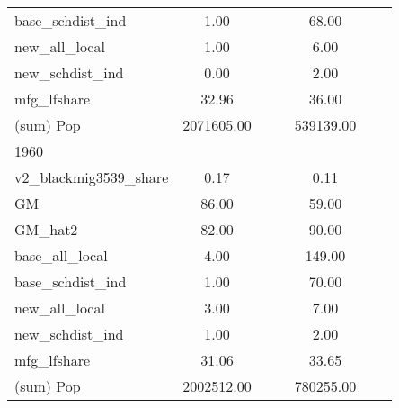 \begin{table}[htbp]
\begin{tabular}{l*{2}{ccc}}
base\_schdist\_ind    &        1.00&            &            &       68.00&            &            \\
new\_all\_local       &        1.00&            &            &        6.00&            &            \\
new\_schdist\_ind     &        0.00&            &            &        2.00&            &            \\
mfg\_lfshare         &       32.96&            &            &       36.00&            &            \\
(sum) Pop           &  2071605.00&            &            &   539139.00&            &            \\
\midrule
1960                &            &            &            &            &            &            \\
v2\_blackmig3539\_share&        0.17&            &            &        0.11&            &            \\
GM                  &       86.00&            &            &       59.00&            &            \\
GM\_hat2             &       82.00&            &            &       90.00&            &            \\
base\_all\_local      &        4.00&            &            &      149.00&            &            \\
base\_schdist\_ind    &        1.00&            &            &       70.00&            &            \\
new\_all\_local       &        3.00&            &            &        7.00&            &            \\
new\_schdist\_ind     &        1.00&            &            &        2.00&            &            \\
mfg\_lfshare         &       31.06&            &            &       33.65&            &            \\
(sum) Pop           &  2002512.00&            &            &   780255.00&            &            \\
\bottomrule
\end{tabular}
\end{table}
